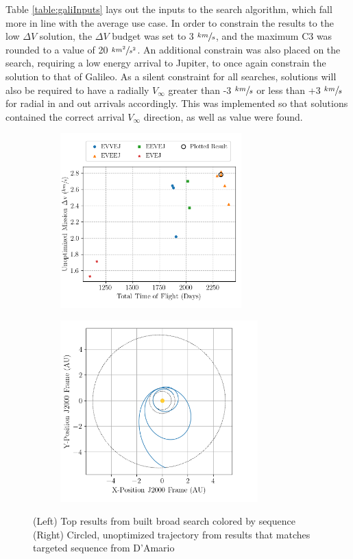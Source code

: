 \documentclass[letterpaper, preprint, paper,11pt]{AAS}	%
\begin{document}
Table \ref*{table:galiInputs} lays out the inputs to the search algorithm, which fall more in line with the average use case. In order to constrain the results to the low $\Delta V$ solution, the $\Delta V$ budget was set to 3 $\sfrac{km}{s}$, and the maximum C3 was rounded to a value of 20 $\sfrac{km^2}{s^2}$. An additional constrain was also placed on the search, requiring a low energy arrival to Jupiter, to once again constrain the solution to that of Galileo. As a silent constraint for all searches, solutions will also be required to have a radially $V_\infty$ greater than -3 $\sfrac{km}{s}$ or less than +3 $\sfrac{km}{s}$ for radial in and out arrivals accordingly. This was implemented so that solutions contained the correct arrival $V_\infty$ direction, as well as value were found.

\begin{figure}[htb]
    \begin{subfigure}
        \centering\includegraphics[width=2.75in]{./fig/galileoResults.png}
    \end{subfigure}
    \begin{subfigure}
        \centering\includegraphics[width=3in]{./fig/galileoMCTS.png}
    \end{subfigure}
    \caption{(Left) Top results from built broad search colored by sequence\hspace{1em} (Right) Circled, unoptimized trajectory from results that matches targeted sequence from D'Amario \cite{DAmario1992}}
    \label{fig:galiResults}
\end{figure}
\end{document}
